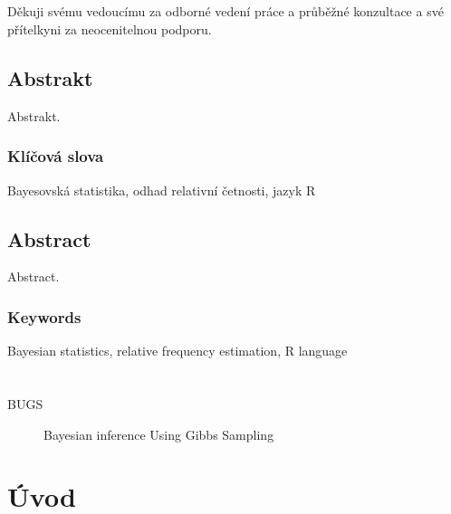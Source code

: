 \documentclass[
  11pt,
  a4paper]{report}
\let\openright=\clearpage
\def\Podekovani{%
Děkuji svému vedoucímu za odborné vedení práce a průběžné konzultace a své přítelkyni za neocenitelnou podporu.
}
\def\Abstrakt{%
Abstrakt.
}
\def\AbstraktEN{%
Abstract.
}
\def\KlicovaSlova{Bayesovská statistika, odhad relativní četnosti, jazyk R}
\def\KlicovaSlovaEN{Bayesian statistics, relative frequency estimation, R language}
\begin{document}
\hypersetup{pageanchor=true}
\cleardoublepage
\pagestyle{plain}
\openright
\vspace*{\fill}
\section*{\PodekovaniText}
\noindent
\Podekovani
\vspace{1cm}


\openright
\section*{Abstrakt}
\noindent
\Abstrakt
\subsection*{Klíčová slova}
\noindent
\KlicovaSlova

\bigskip\bigskip\bigskip\bigskip\bigskip
\section*{Abstract}
\noindent
\AbstraktEN
\subsection*{Keywords}
\noindent
\KlicovaSlovaEN

\openright

\setcounter{tocdepth}{2}
\tableofcontents

\openright
\listoffigures

\clearpage
\listoftables

\clearpage
\lstlistoflistings

\chapter*{\SeznamZkratek}

\begin{multicols}{2}
\raggedright
\begin{description}
\item [BUGS] Bayesian inference Using Gibbs Sampling
\end{description}
\end{multicols}

\chapter*{Úvod}
\end{document}
